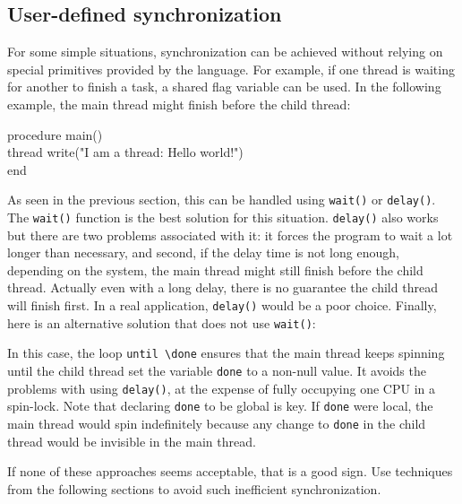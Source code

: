 \subsection{User-defined synchronization}

For some simple situations, synchronization can be achieved without relying on
special primitives provided by the language.  For example, if one thread is
waiting for another to finish a task, a shared flag variable can be used. In the
following example, the main thread might finish before the child thread:
\begin{icode}
procedure main() \\
\>   thread write("I am a thread: Hello world!") \\
end
\end{icode}
As seen in the previous section, this can be handled using \texttt{wait()} or
\texttt{delay()}. The \texttt{wait()} function is the best solution for this
situation. \texttt{delay()} also works but there are two problems associated
with it: it forces the program to wait a lot longer than necessary, and second,
if the delay time is not long enough, depending on the system, the main thread
might still finish before the child thread.  Actually even with a long delay,
there is no guarantee the child thread will finish first. In a real application,
\texttt{delay()} would be a poor choice.  Finally, here is an alternative
solution that does not use \texttt{wait()}:


In this case, the loop \texttt{until \textbackslash done} ensures that the main
thread keeps spinning until the child thread set the variable \texttt{done} to a
non-null value.  It avoids the problems with using \texttt{delay()}, at the
expense of fully occupying one CPU in a spin-lock.  Note that declaring
\texttt{done} to be global is key. If \texttt{done} were local, the main thread
would spin indefinitely because any change to \texttt{done} in the child thread
would be invisible in the main thread.

If none of these approaches seems acceptable, that is a good sign. Use
techniques from the following sections to avoid such inefficient
synchronization.

